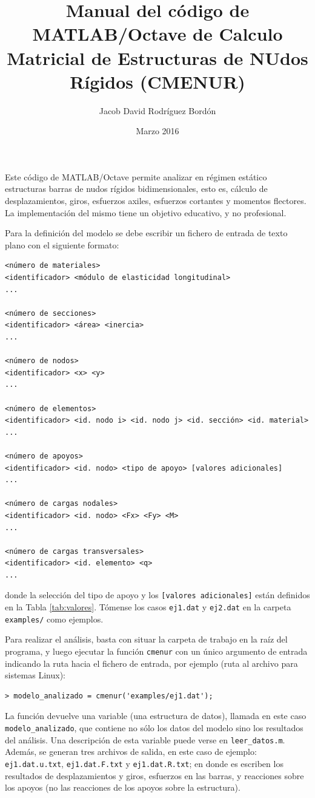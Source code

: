 \documentclass[a4paper,11pt]{article}
\title{Manual del código de MATLAB/Octave de Calculo Matricial de Estructuras de NUdos R\'igidos (CMENUR)}
\author{Jacob David Rodr\'iguez Bord\'on}
\date{Marzo 2016}
\begin{document}
\maketitle

Este código de MATLAB/Octave permite analizar en régimen estático estructuras barras de nudos rígidos bidimensionales, esto es, cálculo de desplazamientos, giros, esfuerzos axiles, esfuerzos cortantes y momentos flectores. La implementación del mismo tiene un objetivo educativo, y no profesional.

Para la definición del modelo se debe escribir un fichero de entrada de texto plano con el siguiente formato:
\begin{Verbatim}[frame=single,fontsize=\small]
<número de materiales>
<identificador> <módulo de elasticidad longitudinal>
...

<número de secciones>
<identificador> <área> <inercia>
...

<número de nodos>
<identificador> <x> <y>
...

<número de elementos>
<identificador> <id. nodo i> <id. nodo j> <id. sección> <id. material>
...

<número de apoyos>
<identificador> <id. nodo> <tipo de apoyo> [valores adicionales]
...

<número de cargas nodales>
<identificador> <id. nodo> <Fx> <Fy> <M>
...

<número de cargas transversales>
<identificador> <id. elemento> <q> 
...

\end{Verbatim}
donde la selección del tipo de apoyo y los \texttt{[valores adicionales]} están definidos en la Tabla \ref{tab:valores}. Tómense los casos \texttt{ej1.dat} y \texttt{ej2.dat} en la carpeta \texttt{examples/} como ejemplos.

Para realizar el análisis, basta con situar la carpeta de trabajo en la raíz del programa, y luego ejecutar la función \texttt{cmenur} con un único argumento de entrada indicando la ruta hacia el fichero de entrada, por ejemplo (ruta al archivo para sistemas Linux):
\begin{Verbatim}[frame=single,fontsize=\small]
> modelo_analizado = cmenur('examples/ej1.dat');
\end{Verbatim}
La función devuelve una variable (una estructura de datos), llamada en este caso \texttt{modelo\_analizado}, que contiene no sólo los datos del modelo sino los resultados del análisis. Una descripción de esta variable puede verse en \texttt{leer\_datos.m}. Además, se generan tres archivos de salida, en este caso de ejemplo: \texttt{ej1.dat.u.txt}, \texttt{ej1.dat.F.txt} y \texttt{ej1.dat.R.txt}; en donde es escriben los resultados de desplazamientos y giros, esfuerzos en las barras, y reacciones sobre los apoyos (no las reacciones de los apoyos sobre la estructura).
\end{document}
